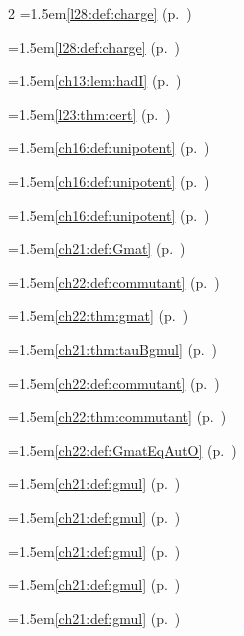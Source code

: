\begin{multicols}{2}
\hangindent=1.5em\quad \ref{l28:def:charge} (p.~\pageref{l28:def:charge})\par
\hangindent=1.5em\quad \ref{l28:def:charge} (p.~\pageref{l28:def:charge})\par
\hangindent=1.5em\quad \ref{ch13:lem:hadI} (p.~\pageref{ch13:lem:hadI})\par
\hangindent=1.5em\quad \ref{l23:thm:cert} (p.~\pageref{l23:thm:cert})\par
\hangindent=1.5em\quad \ref{ch16:def:unipotent} (p.~\pageref{ch16:def:unipotent})\par
\hangindent=1.5em\quad \ref{ch16:def:unipotent} (p.~\pageref{ch16:def:unipotent})\par
\hangindent=1.5em\quad \ref{ch16:def:unipotent} (p.~\pageref{ch16:def:unipotent})\par
\hangindent=1.5em\quad \ref{ch21:def:Gmat} (p.~\pageref{ch21:def:Gmat})\par
\hangindent=1.5em\quad \ref{ch22:def:commutant} (p.~\pageref{ch22:def:commutant})\par
\hangindent=1.5em\quad \ref{ch22:thm:gmat} (p.~\pageref{ch22:thm:gmat})\par
\hangindent=1.5em\quad \ref{ch21:thm:tauBgmul} (p.~\pageref{ch21:thm:tauBgmul})\par
\hangindent=1.5em\quad \ref{ch22:def:commutant} (p.~\pageref{ch22:def:commutant})\par
\hangindent=1.5em\quad \ref{ch22:thm:commutant} (p.~\pageref{ch22:thm:commutant})\par
\hangindent=1.5em\quad \ref{ch22:def:GmatEqAutO} (p.~\pageref{ch22:def:GmatEqAutO})\par
\hangindent=1.5em\quad \ref{ch21:def:gmul} (p.~\pageref{ch21:def:gmul})\par
\hangindent=1.5em\quad \ref{ch21:def:gmul} (p.~\pageref{ch21:def:gmul})\par
\hangindent=1.5em\quad \ref{ch21:def:gmul} (p.~\pageref{ch21:def:gmul})\par
\hangindent=1.5em\quad \ref{ch21:def:gmul} (p.~\pageref{ch21:def:gmul})\par
\hangindent=1.5em\quad \ref{ch21:def:gmul} (p.~\pageref{ch21:def:gmul})\par

\end{multicols}
